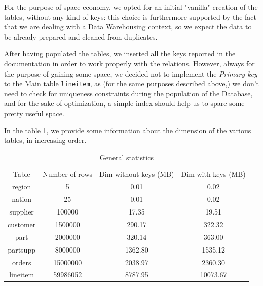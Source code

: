 For the purpose of space economy, we opted for an initial "vanilla" creation of the tables, without any kind of keys: this choice is furthermore supported by the fact that we are dealing with a Data Warehousing context, so we expect the data to be already prepared and cleaned from duplicates.

After having populated the tables, we inserted all the keys reported in the documentation in order to work properly with the relations. However, always for the purpose of gaining some space, we decided not to implement the \textit{Primary key} to the Main table \texttt{lineitem}, as (for the same purposes described above,) we don't need to check for uniqueness constraints during the population of the Database, and for the sake of optimization, a simple index should help us to spare some pretty useful space.

In the table \ref{tab:table_dimensions}, we provide some information about the dimension of the various tables, in increasing order.

\begin{table}[h!]
\centering
\begin{tabular}{c|c|c|c}
\rowcolor{blue!50} Table & Number of rows & Dim without keys (MB) & Dim with keys (MB)\\
\rowcolor{gray!10} region & 5 & 0.01 & 0.02\\ 
\rowcolor{white} nation & 25 & 0.01 & 0.02\\ 
\rowcolor{gray!10} supplier & 100000 & 17.35  & 19.51 \\ 
\rowcolor{white} customer & 1500000& 290.17  & 322.32 \\ 
\rowcolor{gray!10} part & 2000000 & 320.14  & 363.00 \\ 
\rowcolor{white} partsupp & 8000000 & 1362.80  & 1535.12 \\
\rowcolor{gray!10} orders & 15000000 & 2038.97  & 2360.30 \\
\rowcolor{white} lineitem & 59986052 & 8787.95  & 10073.67 \\
\end{tabular}\\[0.5cm]
    \caption{General statistics}
    \label{tab:table_dimensions}
\end{table}